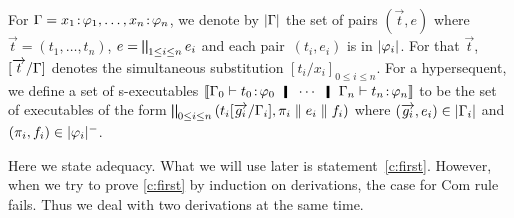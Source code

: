 For $\Gamma = {x_1} \mathord{\colon\kern -2pt}{\varphi_1},\ldots,{x_n} \mathord{\colon\kern -2pt}{\varphi_n}$,
we denote by $|{\Gamma}|$ the set of pairs $(\vec t,e)$ where
$\vec{t} = (t_1,\dots,t_n)$, $e = \bigparallel_{1\le i\le n} e_i$
 and each pair~$(t_i, e_i)$ is in $|{\varphi_i}|$.
For that $\vec t$, $[\overrightarrow{t}/\Gamma]$ denotes the simultaneous substitution
$[t_i/x_i]_{0\le i \le n}$.
For a hypersequent, we
define a set of s-executables
$
\semo{\G_0\tr\tj{t_0}{\phi_0}\hmid\cdots\hmid\G_n\tr\tj{t_n}{\phi_n}}
$
to be the set of executables of the form $\bigparallel_{0\le i\le
n}\left(t_i[\overrightarrow{g_i}/\Gamma_i],\pi_i\parallel e_i\parallel f_i\right)$ where
$(\overrightarrow{g_i},e_i) \in |{\Gamma_i}|$ and $(\pi_i,f_i)\in |{\varphi_i}|^-$.

Here we state adequacy.  What we will use later is statement~\ref{c:first}.
However, when we try to prove \ref{c:first} by induction on derivations,
the case for Com rule fails.  Thus we deal with two derivations at the
same time.

